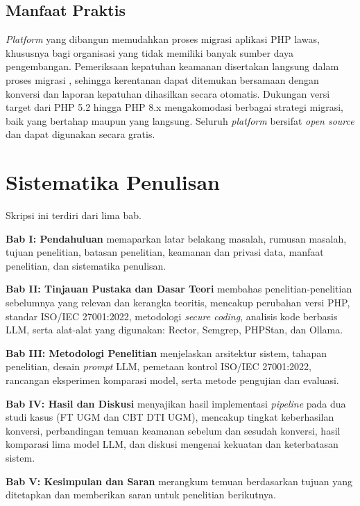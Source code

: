 \subsection{Manfaat Praktis}

\textit{Platform} yang dibangun memudahkan proses migrasi aplikasi PHP lawas, khususnya bagi organisasi yang tidak memiliki banyak sumber daya pengembangan. Pemeriksaan kepatuhan keamanan disertakan langsung dalam proses migrasi \cite{iso27001_2022}, sehingga kerentanan dapat ditemukan bersamaan dengan konversi dan laporan kepatuhan dihasilkan secara otomatis. Dukungan versi target dari PHP 5.2 hingga PHP 8.x mengakomodasi berbagai strategi migrasi, baik yang bertahap maupun yang langsung. Seluruh \textit{platform} bersifat \textit{open source} dan dapat digunakan secara gratis.

\section{Sistematika Penulisan}

Skripsi ini terdiri dari lima bab.

\noindent \textbf{Bab I: Pendahuluan} memaparkan latar belakang masalah, rumusan masalah, tujuan penelitian, batasan penelitian, keamanan dan privasi data, manfaat penelitian, dan sistematika penulisan.

\noindent \textbf{Bab II: Tinjauan Pustaka dan Dasar Teori} membahas penelitian-penelitian sebelumnya yang relevan dan kerangka teoritis, mencakup perubahan versi PHP, standar ISO/IEC 27001:2022, metodologi \textit{secure coding}, analisis kode berbasis LLM, serta alat-alat yang digunakan: Rector, Semgrep, PHPStan, dan Ollama.

\noindent \textbf{Bab III: Metodologi Penelitian} menjelaskan arsitektur sistem, tahapan penelitian, desain \textit{prompt} LLM, pemetaan kontrol ISO/IEC 27001:2022, rancangan eksperimen komparasi model, serta metode pengujian dan evaluasi.

\noindent \textbf{Bab IV: Hasil dan Diskusi} menyajikan hasil implementasi \textit{pipeline} pada dua studi kasus (FT UGM dan CBT DTI UGM), mencakup tingkat keberhasilan konversi, perbandingan temuan keamanan sebelum dan sesudah konversi, hasil komparasi lima model LLM, dan diskusi mengenai kekuatan dan keterbatasan sistem.

\noindent \textbf{Bab V: Kesimpulan dan Saran} merangkum temuan berdasarkan tujuan yang ditetapkan dan memberikan saran untuk penelitian berikutnya.